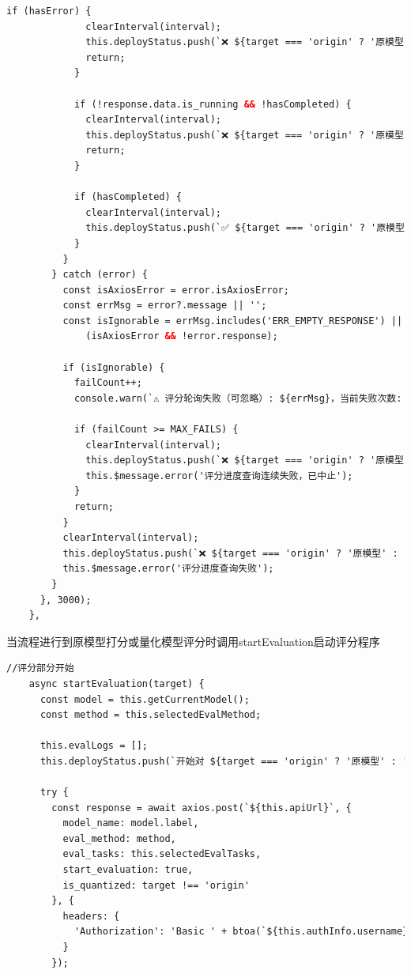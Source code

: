 \documentclass[AutoFakeBold,AutoFakeSlant,language=chinese,degree=bachelor]{sustechthesis}
\begin{document}
\begin{itemize}
\begin{lstlisting}[language=HTML]
            if (hasError) {
              clearInterval(interval);
              this.deployStatus.push(`❌ ${target === 'origin' ? '原模型' : '量化模型'} 评分失败，请检查日志`);
              return;
            }

            if (!response.data.is_running && !hasCompleted) {
              clearInterval(interval);
              this.deployStatus.push(`❌ ${target === 'origin' ? '原模型' : '量化模型'} 评分中断但未检测到“完成”关键词，可能失败`);
              return;
            }

            if (hasCompleted) {
              clearInterval(interval);
              this.deployStatus.push(`✅ ${target === 'origin' ? '原模型' : '量化模型'} 评分完成`);
            }
          }
        } catch (error) {
          const isAxiosError = error.isAxiosError;
          const errMsg = error?.message || '';
          const isIgnorable = errMsg.includes('ERR_EMPTY_RESPONSE') ||
              (isAxiosError && !error.response);

          if (isIgnorable) {
            failCount++;
            console.warn(`⚠️ 评分轮询失败（可忽略）: ${errMsg}，当前失败次数: ${failCount}`);

            if (failCount >= MAX_FAILS) {
              clearInterval(interval);
              this.deployStatus.push(`❌ ${target === 'origin' ? '原模型' : '量化模型'} 连续多次无法获取评分进度，任务可能失败`);
              this.$message.error('评分进度查询连续失败，已中止');
            }
            return;
          }
          clearInterval(interval);
          this.deployStatus.push(`❌ ${target === 'origin' ? '原模型' : '量化模型'} 评分进度获取失败: ${errMsg}`);
          this.$message.error('评分进度查询失败');
        }
      }, 3000);
    },
    \end{lstlisting}
    当流程进行到原模型打分或量化模型评分时调用startEvaluation启动评分程序
    \begin{lstlisting}[language=HTML]
    //评分部分开始
    async startEvaluation(target) {
      const model = this.getCurrentModel();
      const method = this.selectedEvalMethod;

      this.evalLogs = [];
      this.deployStatus.push(`开始对 ${target === 'origin' ? '原模型' : '量化模型'} 进行评分（方法：${method}）...`);

      try {
        const response = await axios.post(`${this.apiUrl}`, {
          model_name: model.label,
          eval_method: method,
          eval_tasks: this.selectedEvalTasks,
          start_evaluation: true,
          is_quantized: target !== 'origin'
        }, {
          headers: {
            'Authorization': 'Basic ' + btoa(`${this.authInfo.username}:${this.authInfo.password}`)
          }
        });


\end{lstlisting}
\end{itemize}
\end{document}
